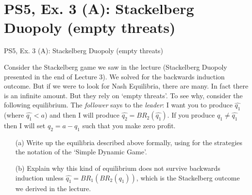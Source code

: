 \section{PS5, Ex. 3 (A): Stackelberg Duopoly (empty threats)}

\begin{frame}{PS5, Ex. 3 (A): Stackelberg Duopoly (empty threats)}
  \begin{multicols}{2}
    Consider the Stackelberg game we saw in the lecture (Stackelberg Duopoly presented in the end of Lecture 3). We solved for the backwards induction outcome. But if we were to look for Nash Equilibria, there are many. In fact there is an infinite amount. But they rely on ‘empty threats’. To see why, consider the following equilibrium. The \textit{follower} says to the \textit{leader}: I want you to produce $\widehat{q_1}$ (where $\widehat{q_1} < a$) and then I will produce $\widehat{q_2} = BR_2(\widehat{q_1})$. If you produce $q_1\neq\widehat{q_1}$ then I will set $q_2=a-q_1$ such that you make zero profit.
    \vfill\null \columnbreak
    \begin{itemize}
      \item[(a)] Write up the equilibria described above formally, using for the strategies the notation of the ‘Simple Dynamic Game’.
      \item[(b)] Explain why this kind of equilibrium does not survive backwards induction unless $\widehat{q_1}=BR_1\left(BR_2(q_1)\right)$, which is the Stackelberg outcome we derived in the lecture.
    \end{itemize}
    \vfill\null
  \end{multicols}
\end{frame}

